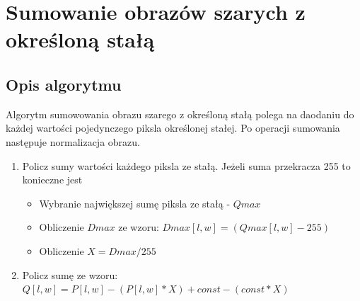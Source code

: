 \documentclass[a4paper,12pt, titlepage]{report}
\begin{document}
\section{Sumowanie obrazów szarych z określoną stałą}
\subsection*{Opis algorytmu}
\par Algorytm sumowowania obrazu szarego z określoną stałą polega na daodaniu do każdej wartości pojedynczego piksla określonej stałej. Po operacji sumowania następuje normalizacja obrazu.
\begin{enumerate}
\item Policz sumy wartości każdego piksla ze stałą. Jeżeli suma przekracza 255 to konieczne jest
\begin{itemize}
\item Wybranie największej sumę piksla ze stałą - \(Q{max}\) 
\item Obliczenie \(D{max}\) ze wzoru: \(D{max}[l,w]=(Q{max}[l,w]-255)\)
\item Obliczenie \(X=D{max}/255\)
\end{itemize}
\item Policz sumę ze wzoru: \(Q[l,w]=P[l,w]-(P[l, w]*X)+const-(const*X)\)
\end{enumerate}
\end{document}
